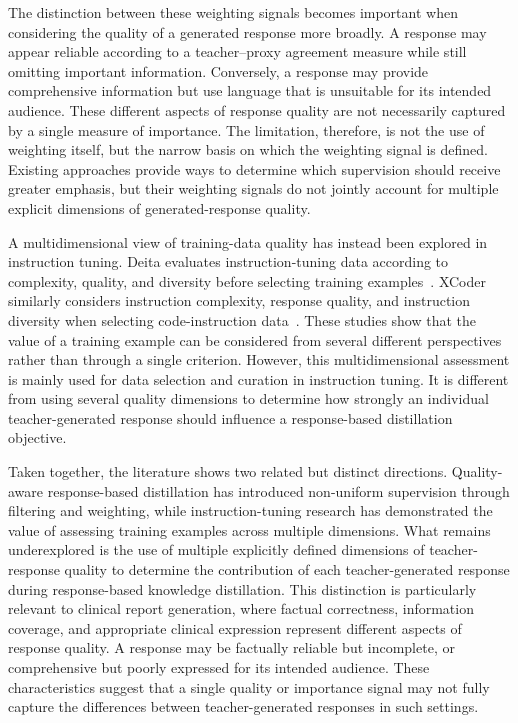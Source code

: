 \documentclass[ %
                    author={Aman Kumar Singh},
                supervisor={Dr. Edwin Simpson},
                    degree={MSc},
                     title={Quality-Aware Knowledge Distillation of Large Language Models for Efficient Personalised Clinical Report Generation},
                  subtitle={},
                      type={},
                      year={2021}]{dissertation}
\begin{document}
The distinction between these weighting signals becomes important when considering
the quality of a generated response more broadly. A response may appear
reliable according to a teacher--proxy agreement measure while still omitting
important information. Conversely, a response may provide comprehensive
information but use language that is unsuitable for its intended audience.
These different aspects of response quality are not necessarily captured by a
single measure of importance. The limitation, therefore, is not the use of
weighting itself, but the narrow basis on which the weighting signal is
defined. Existing approaches provide ways to determine which supervision
should receive greater emphasis, but their weighting signals do not jointly
account for multiple explicit dimensions of generated-response quality.

A multidimensional view of training-data quality has instead been explored in
instruction tuning. Deita evaluates instruction-tuning
data according to complexity, quality, and diversity before selecting training
examples~\cite{liu_what_2024}. XCoder similarly considers instruction
complexity, response quality, and instruction diversity when selecting
code-instruction data~\cite{wang_how_2024}. These studies show that the value of a training
example can be considered from several different perspectives rather than
through a single criterion. However, this multidimensional assessment
is mainly used for data selection and curation in instruction tuning. It is
different from using several quality dimensions to determine how strongly an
individual teacher-generated response should influence a response-based
distillation objective.

Taken together, the literature shows two related but distinct directions.
Quality-aware response-based distillation has introduced non-uniform
supervision through filtering and weighting, while instruction-tuning research
has demonstrated the value of assessing training examples across multiple
dimensions. What remains underexplored is the use of multiple explicitly
defined dimensions of teacher-response quality to determine the contribution
of each teacher-generated response during response-based knowledge
distillation. This distinction is particularly relevant to clinical report
generation, where factual correctness, information coverage, and appropriate
clinical expression represent different aspects of response quality. A
response may be factually reliable but incomplete, or comprehensive but
poorly expressed for its intended audience. These characteristics suggest
that a single quality or importance signal may not fully capture the
differences between teacher-generated responses in such settings.
\end{document}
